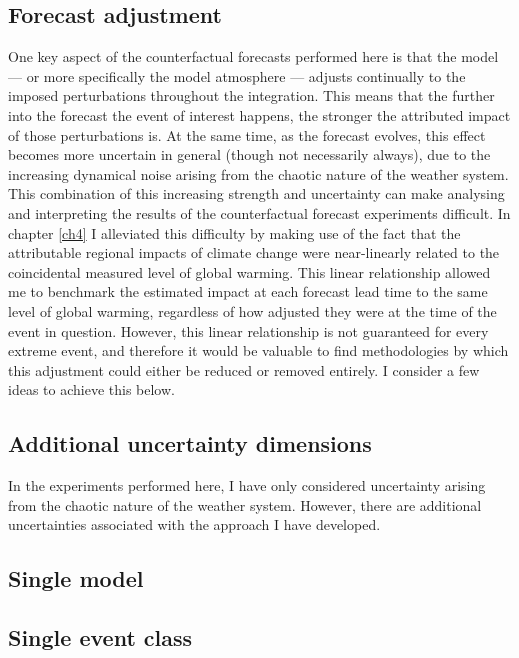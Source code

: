   \subsection*{Forecast adjustment}

    One key aspect of the counterfactual forecasts performed here is that the model --- or more specifically the model atmosphere --- adjusts continually to the imposed perturbations throughout the integration. This means that the further into the forecast the event of interest happens, the stronger the attributed impact of those perturbations is. At the same time, as the forecast evolves, this effect becomes more uncertain in general (though not necessarily always), due to the increasing dynamical noise arising from the chaotic nature of the weather system. This combination of this increasing strength and uncertainty can make analysing and interpreting the results of the counterfactual forecast experiments difficult. In chapter \ref{ch4} I alleviated this difficulty by making use of the fact that the attributable regional impacts of climate change were near-linearly related to the coincidental measured level of global warming. This linear relationship allowed me to benchmark the estimated impact at each forecast lead time to the same level of global warming, regardless of how adjusted they were at the time of the event in question. However, this linear relationship is not guaranteed for every extreme event, and therefore it would be valuable to find methodologies by which this adjustment could either be reduced or removed entirely. I consider a few ideas to achieve this below.

  \subsection*{Additional uncertainty dimensions}

    In the experiments performed here, I have only considered uncertainty arising from the chaotic nature of the weather system. However, there are additional uncertainties associated with the approach I have developed. 

  \subsection*{Single model}

  \subsection*{Single event class}

